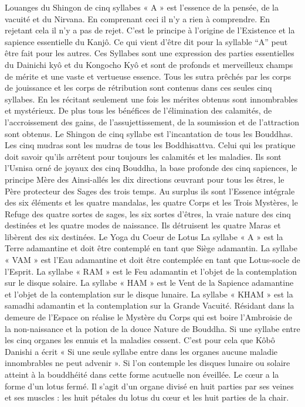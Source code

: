 Louanges du Shingon de cinq syllabes
« A » est l’essence de la pensée, de la vacuité et du Nirvana. En comprenant ceci il n’y a rien à comprendre. En rejetant cela il n’y a pas de rejet. C’est le principe à l’origine de l’Existence et la sapience essentielle du Kanjô.
Ce qui vient d’être dit pour la syllable “A” peut être fait pour les autres. Ces Syllabes sont une expression des parties essentielles du Dainichi kyô et du Kongocho Kyô et sont de profonds et merveilleux champs de mérite et une vaste et vertueuse essence.
Tous les sutra prêchés par les corps de jouissance et les corps de rétribution sont  contenus dans ces seules cinq syllabes. En les récitant seulement une fois les mérites obtenus sont innombrables et mystérieux. De plus tous les bénéfices de l’élimination des calamités, de l’accroissement des gains, de l’assujettissement, de la soumission et de l’attraction sont obtenus.
Le Shingon de cinq syllabe est l’incantation de tous les Bouddhas. Les cinq mudras sont les mudras de tous les Boddhisattva.
Celui qui les pratique doit savoir qu’ils arrêtent pour toujours les calamités et les maladies. Ils sont l’Usnisa orné de joyaux des cinq Bouddha, la base profonde des cinq sapiences, le principe Mère des Ainsi-allés les dix directions œuvrant pour tous les êtres, le Père protecteur des Sages des trois temps. Au surplus ils sont l’Essence intégrale des six éléments et les quatre mandalas, les quatre Corps et les Trois Mystères, le Refuge des quatre sortes de sages, les six sortes d’êtres, la vraie nature des cinq destinées et les quatre modes de naissance. Ils détruisent les quatre Maras et libèrent des six destinées.
Le Yoga du Coeur de Lotus
La syllabe « A » est la Terre adamantine et doit être contemplé en tant que Siège adamantin.
La syllabe « VAM » est l’Eau adamantine et doit être contemplée en tant que Lotus-socle de l’Esprit.
La syllabe « RAM » est le Feu adamantin et l'objet de la contemplation sur le disque solaire.
La syllabe « HAM » est le Vent de la Sapience adamantine et l'objet de la contemplation sur le  disque lunaire.
La syllabe « KHAM » est la samadhi adamantin et la contemplation sur la Grande Vacuité.
Résidant dans la demeure de l’Espace on réalise le Mystère du Corps qui est boire  l’Ambroisie de la non-naissance et la potion de la douce Nature de Bouddha.
Si une syllabe entre les cinq organes les ennuis et la maladies cessent. C'est pour cela que Kôbô Danishi a écrit « Si une seule syllabe entre dans les organes aucune maladie innombrables ne peut advenir ».
Si l'on contemple les disques lunaire ou solaire atteint à la bouddhéité dans cette forme acutuelle non éveillée.  Le cœur a la forme d’un lotus fermé. Il s’agit d’un organe divisé en huit parties par ses veines et ses muscles : les huit pétales du lotus du cœur et les huit parties de la chair.
